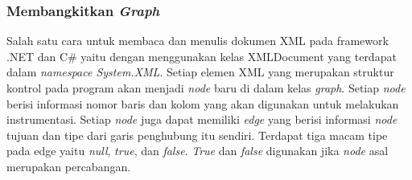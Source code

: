 \subsubsection*{Membangkitkan \textit{Graph}}
Salah satu cara untuk membaca dan menulis dokumen XML pada framework .NET dan C\# yaitu dengan menggunakan kelas XMLDocument yang terdapat dalam \textit{namespace System.XML}. Setiap elemen XML yang merupakan struktur kontrol pada program akan menjadi \textit{node} baru di dalam kelas \textit{graph}. Setiap \textit{node} berisi informasi nomor baris dan kolom yang akan digunakan untuk melakukan instrumentasi. Setiap \textit{node} juga dapat memiliki \textit{edge} yang berisi informasi \textit{node} tujuan dan tipe dari garis penghubung itu sendiri. Terdapat tiga macam tipe pada edge yaitu \textit{null}, \textit{true}, dan \textit{false}. \textit{True} dan \textit{false} digunakan jika \textit{node} asal merupakan percabangan.

